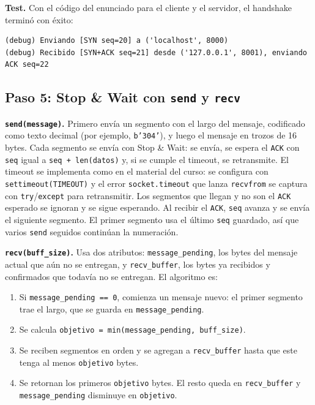 \documentclass[11pt,letterpaper]{article}
\begin{document}
\textbf{Test.} Con el código del enunciado para el cliente y el servidor, el handshake
terminó con éxito:

\begin{lstlisting}
(debug) Enviando [SYN seq=20] a ('localhost', 8000)
(debug) Recibido [SYN+ACK seq=21] desde ('127.0.0.1', 8001), enviando ACK seq=22
\end{lstlisting}

\subsection{Paso 5: Stop \& Wait con \texttt{send} y \texttt{recv}}

\textbf{\texttt{send(message)}.} Primero envía un segmento con el largo del mensaje,
codificado como texto decimal (por ejemplo, \texttt{b'304'}), y luego el mensaje en trozos
de 16 bytes. Cada segmento se envía con Stop \& Wait: se envía, se espera el \texttt{ACK}
con \texttt{seq} igual a \texttt{seq + len(datos)} y, si se cumple el timeout, se
retransmite. El timeout se implementa como en el material del curso: se configura con
\texttt{settimeout(TIMEOUT)} y el error \texttt{socket.timeout} que lanza
\texttt{recvfrom} se captura con \texttt{try}/\texttt{except} para retransmitir. Los
segmentos que llegan y no son el \texttt{ACK} esperado se ignoran y se sigue esperando. Al recibir el \texttt{ACK}, \texttt{seq} avanza y se envía el siguiente
segmento. El primer segmento usa el último \texttt{seq} guardado, así que varios
\texttt{send} seguidos continúan la numeración.

\textbf{\texttt{recv(buff\_size)}.} Usa dos atributos: \texttt{message\_pending}, los
bytes del mensaje actual que aún no se entregan, y \texttt{recv\_buffer}, los bytes ya
recibidos y confirmados que todavía no se entregan. El algoritmo es:

\begin{enumerate}[nosep]
  \item Si \texttt{message\_pending == 0}, comienza un mensaje nuevo: el primer segmento
        trae el largo, que se guarda en \texttt{message\_pending}.
  \item Se calcula \texttt{objetivo = min(message\_pending, buff\_size)}.
  \item Se reciben segmentos en orden y se agregan a \texttt{recv\_buffer} hasta que este
        tenga al menos \texttt{objetivo} bytes.
  \item Se retornan los primeros \texttt{objetivo} bytes. El resto queda en
        \texttt{recv\_buffer} y \texttt{message\_pending} disminuye en \texttt{objetivo}.
\end{enumerate}
\end{document}
